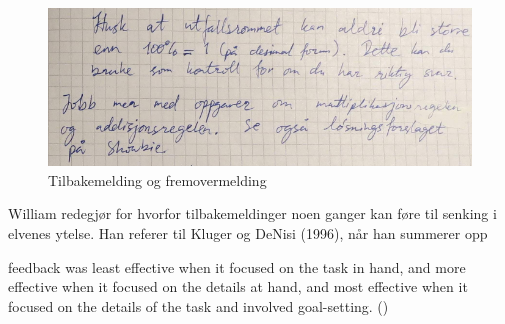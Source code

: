 \documentclass[main.tex]{subfiles}
\begin{document}
\begin{figure}
\centering
\includegraphics[scale = 0.4]{../figures/mohsin2.png}
\caption{Tilbakemelding og fremovermelding}
\label{fig:mohsin2}
\end{figure}

William redegjør for hvorfor tilbakemeldinger noen ganger kan føre til senking 
i elvenes ytelse. Han referer til Kluger og DeNisi (1996), når han summerer opp 
\begin{displayquote}
\textelp{} feedback was least effective when it focused on the task in hand, 
and more effective when it focused on the details at hand, and most effective 
when it focused on the details of the task and involved goal-setting.
()
\end{displayquote}
\end{document}

